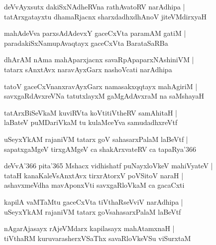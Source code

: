 \documentclass[twoside,12pt,openright]{book}
\newcounter{shloka}[chapter]
\begin{document}
\begin{shloka}
deVvAyxsutx dakiSxNAdheRVna rathAvatoRV narAdhipa |\\
tatArxgatayxtu dhamaRjacnx sharxdadhxdhAnoV jiteVMdirxyaH 
\end{shloka}

\begin{shloka}
mahAdeVva parxsAdAdevxY gaceCxVta paramAM gatiM |\\
paradakiSxNamupAvaqtayx gaceCxVta BarataSaRBa
\end{shloka}

\begin{shloka}
dhArAM nAma mahAparxjacnx savaRpApaparxNAshiniVM |\\
tatarx sAnxtAvx naravAyxGarx nashoVcati narAdhipa 
\end{shloka}

\begin{shloka}
tatoV gaceCxVnanxravAyxGarx namasakxqqtayx mahAgiriM |\\
savxgaRdAvxreVNa tatutxlayxM gaMgAdAvxraM na saMshayaH
\end{shloka}

\begin{shloka}
tatArxBiSeVkaM kuviRVta koVtitiVtheRV samAhitaH |\\
laBateV puMDariVkaM tu kulaMceYva samudadhxreVtf
\end{shloka}

\begin{shloka}
uSeyxYkAM rajaniVM tatarx goV sahasarxPalaM laBeVtf |\\
sapatxgaMgeV tirxgAMgeV ca shakArxvateRV ca tapaRya\char'366 
\end{shloka}

\begin{shloka}
deVvA\char'366 pita\char'365 Mshacx vidhishatf puNayxloVkeV mahiVyateV |\\
tataH kanaKaleVsAnxtAvx tirxrAtorxV poVSitoV naraH |\\
ashavxmeVdha mavAponxVti savxgaRloVkaM  ca gacaCxti 
\end{shloka}

\begin{shloka}
kapilA vaMTaMtu gaceCxVta tiVthaRseVviV narAdhipa |\\
uSeyxYkAM rajaniVM tatarx goVsahasarxPalaM laBeVtf 
\end{shloka}

\begin{shloka}
nAgarAjasayx rAjeVMdarx kapilasayx mahAtamxnaH |\\
tiVthaRM kuruvarasherxVSaThx savaRloVkeVSu viSurxtaM 
\end{shloka}
\end{document}
